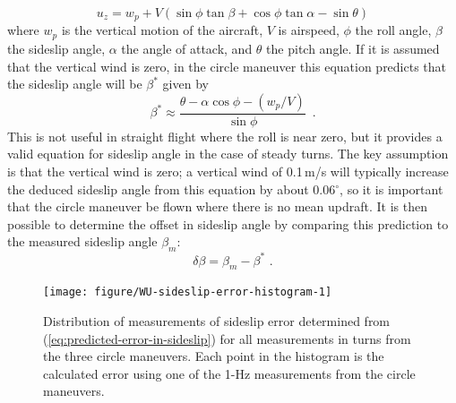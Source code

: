 \documentclass[12pt,twoside,english]{article}\usepackage[]{graphicx}\usepackage[]{color}
\newenvironment{knitrout}{}{} %
\begin{document}
\begin{equation}
u_{z}=w_{p}+V(\sin\phi\tan\beta+\cos\phi\tan\alpha-\sin\theta)\label{eq:vwind-eq-for-SS} 
\end{equation}
where $w_{p}$ is the vertical motion of the aircraft, $V$ is airspeed, $\phi$ the roll angle, $\beta$ the sideslip angle, $\alpha$ the angle of attack, and $\theta$ the pitch angle. If it is assumed that the vertical wind is zero, in the circle maneuver this equation predicts that the sideslip angle will be $\beta^{*}$ given by\\ 
\begin{equation}
\beta^{*}\approx\frac{\theta-\alpha\cos\phi-(w_{p}/V)}{\sin\phi}\,\,\,.\label{eq:beta-from-other-measurements} 
\end{equation}
This is not useful in straight flight where the roll is near zero, but it provides a valid equation for sideslip angle in the case of steady turns. The key assumption is that the vertical wind is zero; a vertical wind of 0.1\,m/s will typically increase the deduced sideslip angle from this equation by about 0.06$^{\circ}$, so it is important that the circle maneuver be flown where there is no mean updraft. It is then possible to determine the offset in sideslip angle by comparing this prediction to the measured sideslip angle $\beta_{m}$:\\ 
\begin{equation}
\delta\beta=\beta_{m}-\beta^{*}\,\,.\label{eq:predicted-error-in-sideslip} 
\end{equation}

\begin{knitrout}\footnotesize
{}\color{fgcolor}\begin{figure}

{\centering \texttt{[image: figure/WU-sideslip-error-histogram-1]} 

}

\caption[Distribution of measurements of sideslip error determined from (\ref{eq:predicted-error-in-sideslip}) for all measurements in turns from the three circle maneuvers.]{Distribution of measurements of sideslip error determined from (\ref{eq:predicted-error-in-sideslip}) for all measurements in turns from the three circle maneuvers. Each point in the histogram is the calculated error using one of the 1-Hz measurements from the circle maneuvers.}\label{fig:sideslip-error-histogram}
\end{figure}


\end{knitrout}
\end{document}
